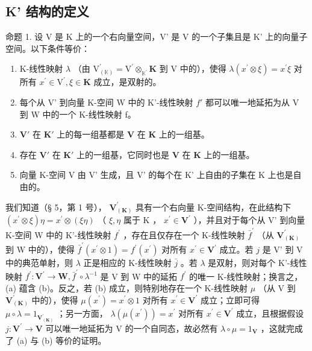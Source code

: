 \subsection{K' 结构的定义}

命题 1. 设 V 是 K 上的一个右向量空间，V' 是 V 的一个子集且是 K' 上的向量子空间。以下条件等价：

\begin{enumerate}
\def\labelenumi{(\alph{enumi})}
\item
  K-线性映射 \(\lambda\) （由 \(\mathrm{V}_{(\mathbb{K})}^{\prime} = \mathrm{V}^{\prime}\otimes_{\mathbb{K}^{\prime}}\mathbf{K}\) 到 V 中的），使得 \(\lambda (x^{\prime}\otimes \xi) = x^{\prime}\xi\) 对所有 \(x^{\prime}\in \mathrm{V}^{\prime},\xi \in \mathbf{K}\) 成立，是双射的。
\item
  每个从 V' 到向量 K-空间 W 中的 K'-线性映射 \(f'\) 都可以唯一地延拓为从 V 到 W 中的一个 K-线性映射 f。
\item
  \(\mathbf{V}'\) 在 \(\mathbf{K}'\) 上的每一组基都是 \(\mathbf{V}\) 在 \(\mathbf{K}\) 上的一组基。
\item
  存在 \(\mathbf{V}'\) 在 \(\mathbf{K}'\) 上的一组基，它同时也是 \(\mathbf{V}\) 在 \(\mathbf{K}\) 上的一组基。
\item
  向量 K-空间 V 由 V' 生成，且 V' 的每个在 K' 上自由的子集在 K 上也是自由的。
\end{enumerate}

我们知道（§ 5，第 1 号）， \(\mathbf{V}_{(\mathbf{K})}^{\prime}\) 具有一个右向量 K-空间结构，在此结构下 \((x^{\prime} \otimes \xi)\eta = x^{\prime} \otimes (\xi\eta)\) （ \(\xi, \eta\) 属于 K ， \(x^{\prime} \in \mathbf{V}^{\prime}\) ），并且对于每个从 V' 到向量 K-空间 W 中的 K'-线性映射 \(f^{\prime}\) ，存在且仅存在一个 K-线性映射 \(\bar{f}^{\prime}\) （从 \(\mathbf{V}_{(\mathbf{K})}^{\prime}\) 到 W 中的），使得 \(\bar{f}^{\prime}(x^{\prime} \otimes 1) = f^{\prime}(x^{\prime})\) 对所有 \(x^{\prime} \in \mathbf{V}^{\prime}\) 成立。若 \(j\) 是 V' 到 V 中的典范单射，则 \(\lambda\) 正是相应的 K-线性映射 \(\bar{j}\) 。若 \(\lambda\) 是双射，则对每个 K'-线性映射 \(f^{\prime}: \mathbf{V}^{\prime} \to \mathbf{W}, \bar{f}^{\prime} \circ \lambda^{-1}\) 是 V 到 W 中的延拓 \(f^{\prime}\) 的唯一 K-线性映射；换言之，(a) 蕴含 (b)。反之，若 (b) 成立，则特别地存在一个 K-线性映射 \(\mu\) （从 V 到 \(\mathbf{V}_{(\mathbf{K})}^{\prime}\) 中的），使得 \(\mu(x^{\prime}) = x^{\prime} \otimes 1\) 对所有 \(x^{\prime} \in \mathbf{V}^{\prime}\) 成立；立即可得 \(\mu \circ \lambda = 1_{\mathbf{V}_{(\mathbf{K})}^{\prime}}\) ；另一方面， \(\lambda(\mu(x^{\prime})) = x^{\prime}\) 对所有 \(x^{\prime} \in \mathbf{V}^{\prime}\) 成立，且根据假设 \(j: \mathbf{V}^{\prime} \to \mathbf{V}\) 可以唯一地延拓为 V 的一个自同态，故必然有 \(\lambda \circ \mu = 1_{\mathbf{V}}\) ，这就完成了 (a) 与 (b) 等价的证明。

